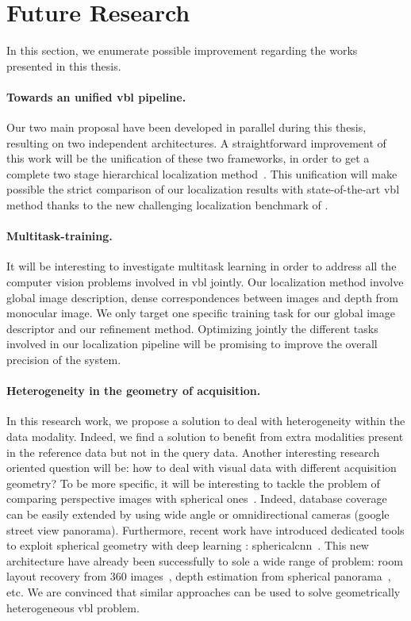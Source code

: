 \section{Future Research}

In this section, we enumerate possible improvement regarding the works presented in this thesis.

\paragraph{Towards an unified \acs{vbl} pipeline.} Our two main proposal have been developed in parallel during this thesis, resulting on two independent architectures. A straightforward improvement of this work will be the unification of these two frameworks, in order to get a complete two stage hierarchical localization method~\citep{Sarlin2018a}. This unification will make possible the strict comparison of our localization results with state-of-the-art \ac{vbl} method thanks to the new challenging localization benchmark of \citep{Sattler2018}.

\paragraph{Multitask-training.} It will be interesting to investigate multitask learning in order to address all the computer vision problems involved in \ac{vbl} jointly. Our localization method involve global image description, dense correspondences between images and depth from monocular image. We only target one specific training task for our global image descriptor and our refinement method. Optimizing jointly the different tasks involved in our localization pipeline will be promising to improve the overall precision of the system.

\paragraph{Heterogeneity in the geometry of acquisition.} In this research work, we propose a solution to deal with heterogeneity within the data modality. Indeed, we find a solution to benefit from extra modalities present in the reference data but not in the query data. Another interesting research oriented question will be: how to deal with visual data with different acquisition geometry? To be more specific, it will be interesting to tackle the problem of comparing perspective images with spherical ones~\citep{Iscen2017,Ramalingam2010,Torii2011,Zamir2010,Zamir2014}. Indeed, database coverage can be easily extended by using wide angle or omnidirectional cameras (\eg google street view panorama). Furthermore, recent work have introduced dedicated tools to exploit spherical geometry with deep learning : spherical\ac{cnn}~\citep{Cohen2018}. This new architecture have already been successfully to sole a wide range of problem: room layout recovery from 360 images~\citep{Fernandez-Labrador2019}, depth estimation from spherical panorama~\citep{Zioulis2018}, etc. We are convinced that similar approaches can be used to solve geometrically heterogeneous \ac{vbl} problem.